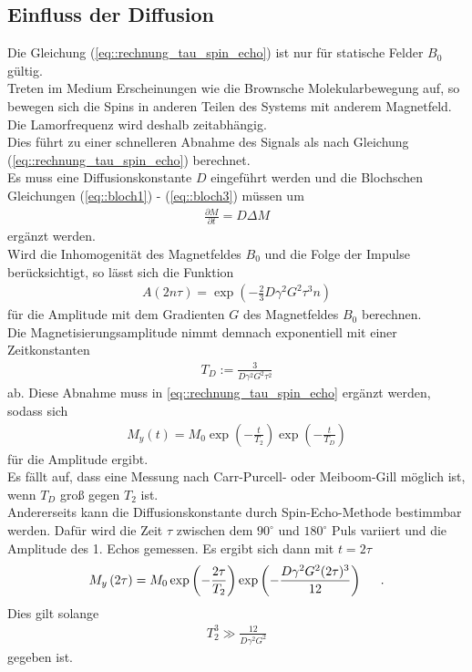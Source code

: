 \documentclass[]{scrartcl}
\begin{document}
\subsection{Einfluss der Diffusion}
Die Gleichung (\ref{eq::rechnung_tau_spin_echo}) ist nur für statische Felder $B_0$ gültig.\\
Treten im Medium Erscheinungen wie die Brownsche Molekularbewegung auf, so bewegen sich die Spins in anderen Teilen des Systems mit anderem Magnetfeld. Die Lamorfrequenz wird deshalb zeitabhängig.\\
Dies führt zu einer schnelleren Abnahme des Signals als nach Gleichung (\ref{eq::rechnung_tau_spin_echo}) berechnet.\\
Es muss eine Diffusionskonstante $D$ eingeführt werden und die Blochschen Gleichungen (\ref{eq::bloch1}) - (\ref{eq::bloch3}) müssen um
\begin{align}
\frac{\partial M}{\partial t} = D\Delta M \label{eq::bloch_diffusion}
\end{align} 
ergänzt werden.\\
Wird die Inhomogenität des Magnetfeldes $B_0$ und die Folge der Impulse berücksichtigt, so lässt sich die Funktion
\begin{align}
A\left(2n\tau\right)= \exp\left( - \frac{2}{3} D\gamma^2G^2\tau^3n\right)
\end{align}
für die Amplitude mit dem Gradienten $G$ des Magnetfeldes $B_0$ berechnen.\\
Die Magnetisierungsamplitude nimmt demnach exponentiell mit einer Zeitkonstanten
\begin{align}
T_D:=\frac{3}{D\gamma^2G^2\tau^2}
\end{align}  
ab. Diese Abnahme muss in \ref{eq::rechnung_tau_spin_echo} ergänzt werden, sodass sich
\begin{align}
M_y\left(t\right)=M_0\exp \left(-\frac{t}{T_2}\right)\exp \left(-\frac{t}{T_D}\right)
\end{align}
für die Amplitude ergibt.\\
Es fällt auf, dass eine Messung nach Carr-Purcell- oder Meiboom-Gill möglich ist, wenn $T_D$ groß gegen $T_2$ ist.\\
Andererseits kann die Diffusionskonstante durch Spin-Echo-Methode bestimmbar werden.
Dafür wird die Zeit $\tau$ zwischen dem  $90^\circ$ und  $180^\circ$ Puls variiert und die Amplitude des 1. Echos gemessen. Es ergibt sich dann mit $t=2\tau$
\begin{align}
M_y\left(2\tau\right)=M_0\exp \left(-\frac{2\tau}{T_2}\right)\exp \left(-\frac{D\gamma^2G^2(2\tau)^3}{12}\right)\hspace*{0.5cm}\text{.}
\end{align}
Dies gilt solange
\begin{align}
T_2^3 \gg \frac{12}{D\gamma^2 G^2}
\end{align}
gegeben ist.
\end{document}
